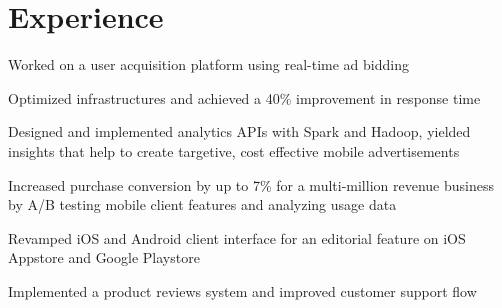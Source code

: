 \documentclass[letterpaper]{deedy-resume} %
\begin{document}
\hfill
%
%
\begin{minipage}[t]{0.66\textwidth} %


\section{Experience}


\vspace{\topsep} %
\begin{tightitemize}
\item Worked on a user acquisition platform using real-time ad bidding
\item Optimized infrastructures and achieved a 40\% improvement in response time
\item Designed and implemented analytics APIs with Spark and Hadoop, yielded insights that help to create targetive, cost effective mobile advertisements
\end{tightitemize}

\sectionspace %



\begin{tightitemize}
\item Increased purchase conversion by up to 7\% for a multi-million revenue business by A/B testing mobile client features and analyzing usage data
\item Revamped iOS and Android client interface for an editorial feature on iOS Appstore and Google Playstore
\item Implemented a product reviews system and improved customer support flow
\end{tightitemize}

\sectionspace %


\end{minipage}
\end{document}
